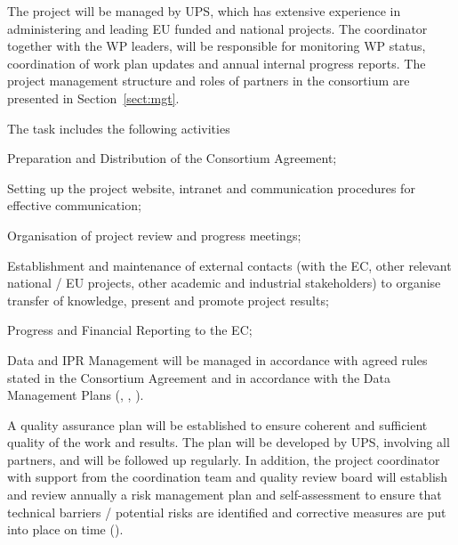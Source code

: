 \begin{workpackage}
\begin{wpdescription}
The project will be managed by UPS, which has extensive experience in
administering and leading EU funded and national projects. The
coordinator together with the WP leaders, will be responsible for
monitoring WP status, coordination of work plan updates and annual
internal progress reports. The project management structure and roles
of partners in the consortium are presented in Section~\ref{sect:mgt}.
\end{wpdescription}

\begin{tasklist}
\begin{task}[title=Project and financial management,
  id=project-finance-management,lead=PS,PM=33,wphases={0-48!.2,0-3,10-12,22-24,34-36,42-48},
  partners={LL,UV,UJF,UB,UO,USH,USO,SA,UW,JU,UK,US,ZH,SR,UG},issue=14]
  The task includes the following activities
  \begin{compactitem}
  \item Preparation and Distribution of the
    Consortium Agreement;
  \item Setting up the project website, intranet and
    communication procedures for effective communication;
  \item
    Organisation of project review and progress meetings;
  \item
    Establishment and maintenance of external contacts (with the EC,
    other relevant national / EU projects, other academic and
    industrial stakeholders) to organise transfer of knowledge,
    present and promote project results;
  \item Progress and Financial Reporting to the EC;
  \item Data and IPR Management will be managed in accordance with
    agreed rules stated in the Consortium Agreement and in accordance
    with the Data Management Plans
    (, , ).
  \end{compactitem}
\end{task}

\begin{task}[title=Quality assurance and risk management,id=project-quality-management,
  wphases=6-48!.3,
  lead=PS,PM=15,partners={LL,UV,UJF,UB,UO,USH,USO,SA,UW,JU,UK,US,ZH,SR,UG},issue=15]
  A quality assurance plan will be established to ensure coherent and
  sufficient quality of the work and results. The plan will be
  developed by UPS, involving all partners, and will be followed up
  regularly. In addition, the project coordinator with support from
  the coordination team and quality review board will establish and
  review annually a risk management plan and self-assessment to ensure
  that technical barriers / potential risks are identified and
  corrective measures are put into place on time
  ().
\end{task}


\end{tasklist}
\end{workpackage}
